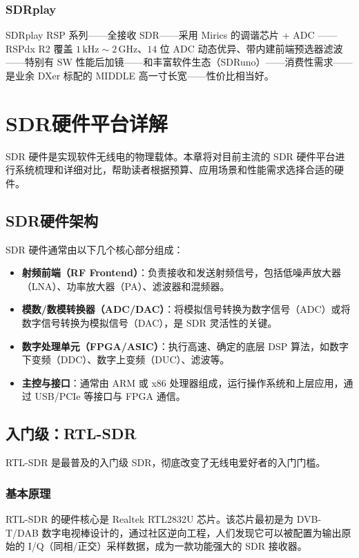 \documentclass[12pt,UTF8]{ctexbook}
\begin{document}
\subsection{SDRplay}

SDRplay RSP 系列——全接收 SDR——采用 Mirics 的调谐芯片 + ADC ——RSPdx R2 覆盖 $1\,\mathrm{kHz}\sim2\,\mathrm{GHz}$、$14$ 位 ADC 动态优异、带内建前端预选器滤波——特别有 SW 性能后加镜——和丰富软件生态（SDRuno）——消费性需求——是业余 DXer 标配的 MIDDLE 高一寸长宽——性价比相当好。

\chapter{SDR硬件平台详解}
\label{chap:sdr_hardware_detailed}

SDR 硬件是实现软件无线电的物理载体。本章将对目前主流的 SDR 硬件平台进行系统梳理和详细对比，帮助读者根据预算、应用场景和性能需求选择合适的硬件。

\section{SDR硬件架构}
\label{sec:sdr_hw_arch}

SDR 硬件通常由以下几个核心部分组成：
\begin{itemize}[leftmargin=2cm]
    \item \textbf{射频前端（RF Frontend）}：负责接收和发送射频信号，包括低噪声放大器（LNA）、功率放大器（PA）、滤波器和混频器。
    \item \textbf{模数/数模转换器（ADC/DAC）}：将模拟信号转换为数字信号（ADC）或将数字信号转换为模拟信号（DAC），是 SDR 灵活性的关键。
    \item \textbf{数字处理单元（FPGA/ASIC）}：执行高速、确定的底层 DSP 算法，如数字下变频（DDC）、数字上变频（DUC）、滤波等。
    \item \textbf{主控与接口}：通常由 ARM 或 x86 处理器组成，运行操作系统和上层应用，通过 USB/PCIe 等接口与 FPGA 通信。
\end{itemize}

\section{入门级：RTL-SDR}
\label{sec:rtl_sdr_detail}

RTL-SDR 是最普及的入门级 SDR，彻底改变了无线电爱好者的入门门槛。

\subsection{基本原理}
RTL-SDR 的硬件核心是 Realtek RTL2832U 芯片。该芯片最初是为 DVB-T/DAB 数字电视棒设计的，通过社区逆向工程，人们发现它可以被配置为输出原始的 I/Q（同相/正交）采样数据，成为一款功能强大的 SDR 接收器。
\end{document}
